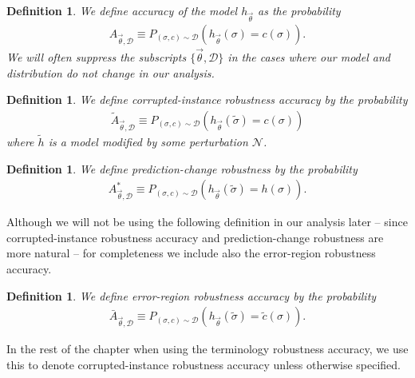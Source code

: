\documentclass[onecolumn,prx, superscriptaddress,longbibliography,margin=1mm 11pt]{revtex4-2}
\newtheorem{definition}[theorem]{Definition}
\begin{document}
\begin{definition} We define \textit{accuracy} of the model $h_{\vec \theta}$ as the probability 
\begin{align}
   A_{\vec \theta, \mathcal{D}} \equiv P_{{(\sigma, c) \sim \mathcal{D}}}(h_{\vec \theta} (\sigma)=c(\sigma)).
\end{align}
We will often suppress the subscripts $\{\vec \theta, \mathcal{D}\}$ in the cases where our model and distribution do not change in our analysis. 
\end{definition}

\begin{definition} We define \textit{corrupted-instance robustness accuracy} by the probability 
\begin{align}
     \tilde{A}_{\vec \theta, \mathcal{D}} \equiv P_{{(\sigma, c) \sim \mathcal{D}}}(h_{\vec \theta} (\tilde{\sigma})=c(\sigma))
\end{align}
where $\tilde{h}$ is a model modified by some perturbation $\mathcal{N}$.
\end{definition}

\begin{definition} We define \textit{prediction-change robustness} by the probability 
\begin{align}
     A^*_{\vec \theta, \mathcal{D}} \equiv P_{{(\sigma, c) \sim \mathcal{D}}}(h_{\vec \theta} (\tilde{\sigma})=h(\sigma)). 
     \end{align}
\end{definition}
Although we will not be using the following definition in our analysis later -- since corrupted-instance robustness accuracy and prediction-change robustness are more natural -- for completeness we include also the error-region robustness accuracy. 
\begin{definition} 
We define \textit{error-region robustness accuracy} by the probability 
\begin{align}
     \bar{A}_{\vec \theta, \mathcal{D}} \equiv P_{{(\sigma, c) \sim \mathcal{D}}}(h_{\vec \theta} (\tilde{\sigma})=\tilde{c}(\sigma)). 
\end{align}
\end{definition}
In the rest of the chapter when using the terminology robustness accuracy, we use this to denote corrupted-instance robustness accuracy unless otherwise specified. 
\end{document}
